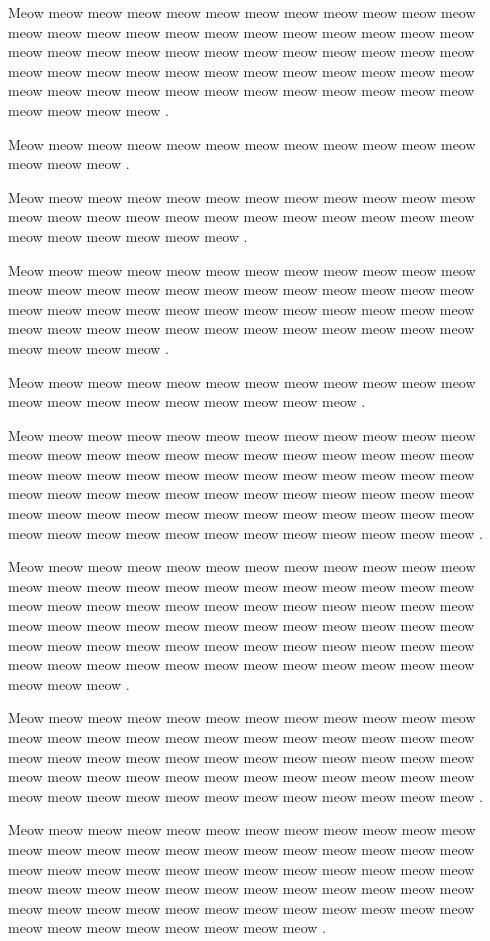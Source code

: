 \documentclass[12pt, a5paper, openany]{book}
\begin{document}
Meow meow meow meow meow meow meow meow meow meow meow meow meow meow meow meow meow meow meow meow meow meow meow meow meow meow meow meow meow meow meow meow meow meow meow meow meow meow meow meow meow meow meow meow meow meow meow meow meow meow meow meow meow meow meow meow meow meow meow meow meow meow meow meow .

Meow meow meow meow meow meow meow meow meow meow meow meow meow meow meow .

Meow meow meow meow meow meow meow meow meow meow meow meow meow meow meow meow meow meow meow meow meow meow meow meow meow meow meow meow meow meow .

Meow meow meow meow meow meow meow meow meow meow meow meow meow meow meow meow meow meow meow meow meow meow meow meow meow meow meow meow meow meow meow meow meow meow meow meow meow meow meow meow meow meow meow meow meow meow meow meow meow meow meow meow .

Meow meow meow meow meow meow meow meow meow meow meow meow meow meow meow meow meow meow meow meow meow .

Meow meow meow meow meow meow meow meow meow meow meow meow meow meow meow meow meow meow meow meow meow meow meow meow meow meow meow meow meow meow meow meow meow meow meow meow meow meow meow meow meow meow meow meow meow meow meow meow meow meow meow meow meow meow meow meow meow meow meow meow meow meow meow meow meow meow meow meow meow meow meow meow .

Meow meow meow meow meow meow meow meow meow meow meow meow meow meow meow meow meow meow meow meow meow meow meow meow meow meow meow meow meow meow meow meow meow meow meow meow meow meow meow meow meow meow meow meow meow meow meow meow meow meow meow meow meow meow meow meow meow meow meow meow meow meow meow meow meow meow meow meow meow meow meow meow meow meow meow .

Meow meow meow meow meow meow meow meow meow meow meow meow meow meow meow meow meow meow meow meow meow meow meow meow meow meow meow meow meow meow meow meow meow meow meow meow meow meow meow meow meow meow meow meow meow meow meow meow meow meow meow meow meow meow meow meow meow meow meow meow .

Meow meow meow meow meow meow meow meow meow meow meow meow meow meow meow meow meow meow meow meow meow meow meow meow meow meow meow meow meow meow meow meow meow meow meow meow meow meow meow meow meow meow meow meow meow meow meow meow meow meow meow meow meow meow meow meow meow meow meow meow meow meow meow meow meow meow meow meow .
\end{document}
